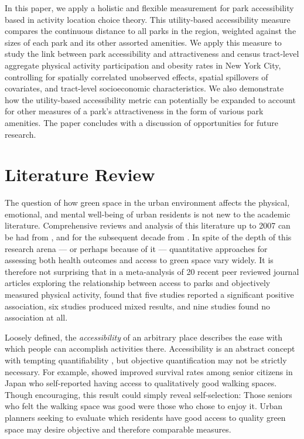 \documentclass[Crown,sageh.bst]{sagej}
\begin{document}
In this paper, we apply a holistic and flexible measurement for park
accessibility based in activity location choice theory. This
utility-based accessibility measure compares the continuous distance to
all parks in the region, weighted against the sizes of each park and its
other assorted amenities. We apply this measure to study the link
between park accessibility and attractiveness and census tract-level
aggregate physical activity participation and obesity rates in New York
City, controlling for spatially correlated unobserved effects, spatial
spillovers of covariates, and tract-level socioeconomic characteristics.
We also demonstrate how the utility-based accessibility metric can
potentially be expanded to account for other measures of a park's
attractiveness in the form of various park amenities. The paper
concludes with a discussion of opportunities for future research.

\hypertarget{literature-review}{%
\section{Literature Review}\label{literature-review}}

\label{sec:litreview} The question of how green space in the urban
environment affects the physical, emotional, and mental well-being of
urban residents is not new to the academic literature. Comprehensive
reviews and analysis of this literature up to 2007 can be had from
\citet{tzoulas2007promoting}, and for the subsequent decade from
\citet{kabisch2015human}. In spite of the depth of this research arena
--- or perhaps because of it --- quantitative approaches for assessing
both health outcomes and access to green space vary widely. It is
therefore not surprising that in a meta-analysis of 20 recent peer
reviewed journal articles exploring the relationship between access to
parks and objectively measured physical activity, \citet{Bancroft2015}
found that five studies reported a significant positive association, six
studies produced mixed results, and nine studies found no association at
all.

Loosely defined, the \emph{accessibility} of an arbitrary place
describes the ease with which people can accomplish activities there.
Accessibility is an abstract concept with tempting quantifiability
\citep{Handy1997}, but objective quantification may not be strictly
necessary. For example, \citet{takano2002urban} showed improved survival
rates among senior citizens in Japan who self-reported having access to
qualitatively good walking spaces. Though encouraging, this result could
simply reveal self-selection: Those seniors who felt the walking space
was good were those who chose to enjoy it. Urban planners seeking to
evaluate which residents have good access to quality green space may
desire objective and therefore comparable measures.
\end{document}
